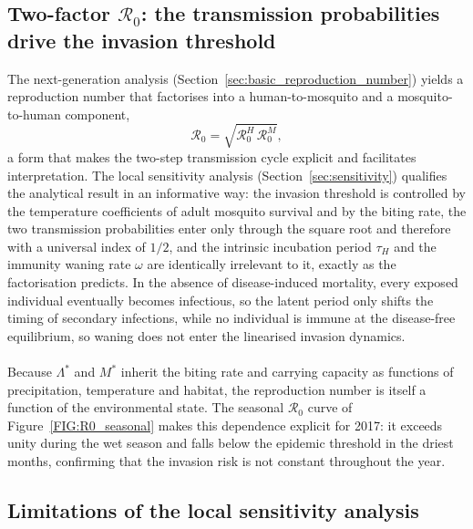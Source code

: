\documentclass[a4paper,fleqn]{cas-dc}
\begin{document}
\subsection{Two-factor $\mathcal{R}_0$: the transmission probabilities drive the invasion threshold}
\label{sec:R0_drive_invasion_threshold}

The next-generation analysis (Section~\ref{sec:basic_reproduction_number}) yields a
reproduction number that factorises into a human-to-mosquito and a
mosquito-to-human component,
$$\mathcal{R}_0 = \sqrt{\mathcal{R}_0^H\,\mathcal{R}_0^M},$$
a form that makes the two-step transmission cycle explicit and facilitates interpretation. The local sensitivity analysis
(Section~\ref{sec:sensitivity}) qualifies the analytical result in an informative way: the invasion threshold is
controlled by the temperature coefficients of adult mosquito survival and by the biting rate, the two transmission
probabilities enter only through the square root and therefore with a universal index of $1/2$, and the intrinsic
incubation period $\tau_H$ and the immunity waning rate $\omega$ are identically irrelevant to it, exactly as the
factorisation predicts. In the absence of disease-induced mortality, every exposed individual eventually becomes infectious, so
the latent period only shifts the timing of secondary infections, while no individual is immune at the disease-free equilibrium, so
waning does not enter the linearised invasion dynamics.
\\\\
Because $\Lambda^*$ and $M^*$ inherit the biting rate and carrying capacity as functions of precipitation, temperature and habitat, the
reproduction number is itself a function of the environmental state. The seasonal $\mathcal{R}_0$ curve of
Figure~\ref{FIG:R0_seasonal} makes this dependence explicit for 2017: it exceeds unity during the wet season and falls below the epidemic
threshold in the driest months, confirming that the invasion risk is not constant throughout the year.

\subsection{Limitations of the local sensitivity analysis}
\label{sec:sensitivity_discussion}
\end{document}
